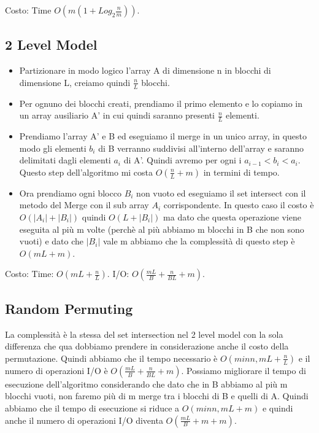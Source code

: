 \documentclass[12pt]{article}
\begin{document}
Costo: Time $O(m(1+Log_2 \frac{n}{m}))$.

\subsection{2 Level Model}

\begin{itemize}
\item Partizionare in modo logico l'array A di dimensione n in blocchi di dimensione L, creiamo quindi $\frac{n}{L}$ blocchi.
\item Per ognuno dei blocchi creati, prendiamo il primo elemento e lo copiamo in un array ausiliario A' in cui quindi saranno presenti $\frac{n}{L}$ elementi.
\item Prendiamo l'array A' e B ed eseguiamo il merge in un unico array, in questo modo gli elementi $b_i$ di B verranno suddivisi all'interno dell'array e saranno delimitati dagli elementi $a_i$ di A'. Quindi avremo per ogni i $a_{i-1}<b_{i}<a_{i}$. Questo step dell'algoritmo mi costa $O(\frac{n}{L} + m)$ in termini di tempo.
\item Ora prendiamo ogni blocco $B_i$ non vuoto ed eseguiamo il set intersect con il metodo del Merge con il sub array $A_i$ corrispondente. In questo caso il costo è $O(|A_i| + |B_i|)$ quindi $O(L + |B_i|)$ ma dato che questa operazione viene eseguita al più m volte (perchè al più abbiamo m blocchi in B che non sono vuoti) e dato che $|B_i|$ vale m abbiamo che la complessità di questo step è $O(mL + m)$.
\end{itemize} 


Costo: Time: $O(mL + \frac{n}{L})$.
I/O: $O(\frac{mL}{B} + \frac{n}{BL} + m)$.

\subsection{Random Permuting}

La complessità è la stessa del set intersection nel 2 level model con la sola differenza che qua dobbiamo prendere in considerazione anche il costo della permutazione. Quindi abbiamo che il tempo necessario è $O(min{n,mL} + \frac{n}{L})$ e il numero di operazioni I/O è $O(\frac{mL}{B} + \frac{n}{BL} + m)$.
Possiamo migliorare il tempo di esecuzione dell'algoritmo considerando che dato che in B abbiamo al più m blocchi vuoti, non faremo più di m merge tra i blocchi di B e quelli di A. Quindi abbiamo che il tempo di esecuzione si riduce a $O(min{n,mL} + m)$ e quindi anche il numero di operazioni I/O diventa $O(\frac{mL}{B} + m + m)$.
\end{document}

